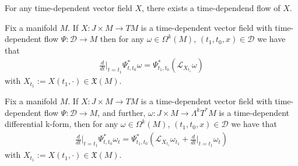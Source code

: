 
\begin{theorem} \cite{lee1} \label{flowthm}
For any time-dependent vector field $X$, there exists a time-dependend flow of $X$.
\end{theorem}

\begin{proposition} \cite{lee1}
Fix a manifold $M$. If $X : J \times M \to TM$ is a time-dependent vector field with time-dependent flow $\Psi: \mathcal{D} \to M$ then for any $\omega \in \Omega^k(M)$, $(t_1,t_0,x) \in \mathcal{D}$ we have that
\begin{align*}
\frac{d}{dt} \bigg\vert_{t=t_1} \Psi^*_{t,t_0} \omega = \Psi^*_{t_1,t_0} \left( \mathcal{L}_{X_{t_1}} \omega \right)
\end{align*}
with $X_{t_1} := X(t_1, \cdot) \in \mathfrak{X}(M)$.
\end{proposition}

\begin{proposition} \cite{lee1}
Fix a manifold $M$. If $X : J \times M \to TM$ is a time-dependent vector field with time-dependent flow $\Psi: \mathcal{D} \to M$, and further, $\omega : J \times M \to \Lambda^k T^* M$ is a time-dependent differential k-form, then for any $\omega \in \Omega^k(M)$, $(t_1,t_0,x) \in \mathcal{D}$ we have that
\begin{align*}
\frac{d}{dt} \bigg\vert_{t=t_1} \Psi^*_{t,t_0} \omega_t = \Psi^*_{t_1,t_0} \left( \mathcal{L}_{X_{t_1}} \omega_{t_1} + \frac{d}{dt} \bigg\vert_{t=t_1} \omega_t \right)
\end{align*}
with $X_{t_1} := X(t_1, \cdot) \in \mathfrak{X}(M)$.
\end{proposition}

